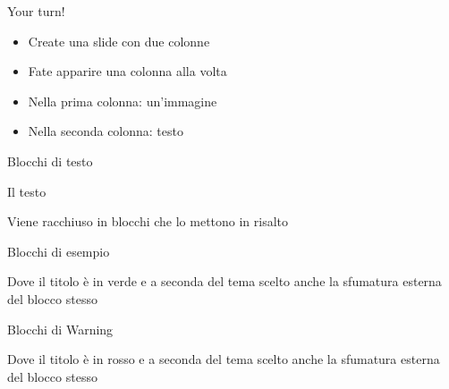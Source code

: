 \documentclass[
  ignorenonframetext,
]{beamer}
\begin{document}
\begin{frame}{Your turn!}
\protect\hypertarget{your-turn-1}{}
\begin{itemize}
\item
  Create una slide con due colonne
\item
  Fate apparire una colonna alla volta
\item
  Nella prima colonna: un'immagine
\item
  Nella seconda colonna: testo
\end{itemize}
\end{frame}

\begin{frame}{Blocchi di testo}
\protect\hypertarget{blocchi-di-testo}{}
\begin{block}{Il testo}

Viene racchiuso in blocchi che lo mettono in risalto

\end{block}

\pause

\vspace{3mm}

\begin{exampleblock}{Blocchi di esempio}

Dove il titolo è in verde e a seconda del tema scelto anche la sfumatura esterna del blocco stesso

\end{exampleblock}

\pause

\vspace{3mm}

\begin{alertblock}{Blocchi di Warning}

Dove il titolo è in rosso e a seconda del tema scelto anche la sfumatura esterna del blocco stesso

\end{alertblock}
\end{frame}
\end{document}
